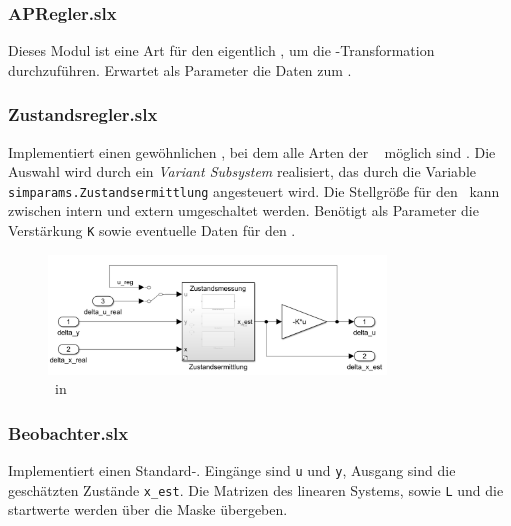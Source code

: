 \subsubsection{APRegler.slx}
Dieses Modul ist eine Art  für den eigentlich \zsr, um die \ap-Transformation durchzuführen.
Erwartet als Parameter die Daten zum \ap.

\subsubsection{Zustandsregler.slx}
Implementiert einen gewöhnlichen \zsr, bei dem alle Arten der \ze\  möglich sind .
Die Auswahl wird durch ein \emph{Variant Subsystem} realisiert, das durch die Variable \texttt{simparams.Zustandsermittlung} angesteuert wird.%
Die Stellgröße für den \beob\ kann zwischen intern und extern umgeschaltet werden.
Benötigt als Parameter die Verstärkung \texttt{K} sowie eventuelle Daten für den \beob.

\begin{figure}[htb]
	\centering
		\includegraphics[width=0.8\textwidth]{Bilder/Simulink/zsr.PNG}
	\caption{\zsr\ in \sm}
	\label{fig:simzsr}
\end{figure}


\subsubsection{Beobachter.slx}
Implementiert einen Standard-\beob. 
Eingänge sind \texttt{u} und \texttt{y}, Ausgang sind die geschätzten Zustände \texttt{x\_est}.
Die Matrizen des linearen Systems, sowie \texttt{L} und die \beob startwerte werden über die Maske übergeben.

